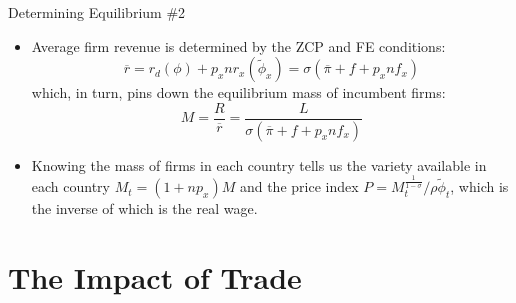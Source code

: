 \documentclass[aspectratio=169]{beamer}
\begin{document}

\begin{frame}{Determining Equilibrium \#2}

\begin{itemize}
    \item<1-> Average firm revenue is determined by the ZCP and FE conditions:
    \begin{equation*}
        \overline{r} = r_{d}\left( \phi \right) + p_{x} n r_{x}\left( \tilde{\phi}_{x} \right) = \sigma \left( \overline{\pi} + f + p_{x} n f_{x} \right)
    \end{equation*}
    which, in turn, pins down the equilibrium mass of incumbent firms:
    \begin{equation}
        M = \frac{R}{\overline{r}} = \frac{L}{\sigma \left( \overline{\pi} + f + p_{x} n f_{x} \right)}
        \label{eq:firmswithtrade}
    \end{equation}
    \item<2-> Knowing the mass of firms in each country tells us the variety available in each country $ M_{t} = \left( 1 +n p_{x} \right) M $ and the price index $ P = M_{t}^{\frac{1}{1 - \sigma}} / \rho \tilde{\phi}_{t} $, which is the inverse of which is the real wage. 
\end{itemize}
    
\end{frame}


\section{The Impact of Trade}

\end{document}
